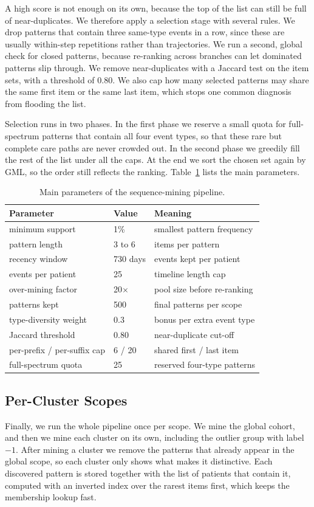 A high score is not enough on its own, because the top of the list can still be full of near-duplicates. We therefore apply a selection stage with several rules. We drop patterns that contain three same-type events in a row, since these are usually within-step repetitions rather than trajectories. We run a second, global check for closed patterns, because re-ranking across branches can let dominated patterns slip through. We remove near-duplicates with a Jaccard test on the item sets, with a threshold of $0.80$. We also cap how many selected patterns may share the same first item or the same last item, which stops one common diagnosis from flooding the list.

Selection runs in two phases. In the first phase we reserve a small quota for full-spectrum patterns that contain all four event types, so that these rare but complete care paths are never crowded out. In the second phase we greedily fill the rest of the list under all the caps. At the end we sort the chosen set again by GML, so the order still reflects the ranking. Table~\ref{tab:params} lists the main parameters.

\begin{table}[t]
\caption{Main parameters of the sequence-mining pipeline.}
\label{tab:params}
\centering
\small
\begin{tabular}{@{}lll@{}}
\toprule
Parameter & Value & Meaning \\
\midrule
minimum support & 1\% & smallest pattern frequency \\
pattern length & 3 to 6 & items per pattern \\
recency window & 730 days & events kept per patient \\
events per patient & 25 & timeline length cap \\
over-mining factor & 20$\times$ & pool size before re-ranking \\
patterns kept & 500 & final patterns per scope \\
type-diversity weight & 0.3 & bonus per extra event type \\
Jaccard threshold & 0.80 & near-duplicate cut-off \\
per-prefix / per-suffix cap & 6 / 20 & shared first / last item \\
full-spectrum quota & 25 & reserved four-type patterns \\
\bottomrule
\end{tabular}
\end{table}

\subsection{Per-Cluster Scopes}

Finally, we run the whole pipeline once per scope. We mine the global cohort, and then we mine each cluster on its own, including the outlier group with label $-1$. After mining a cluster we remove the patterns that already appear in the global scope, so each cluster only shows what makes it distinctive. Each discovered pattern is stored together with the list of patients that contain it, computed with an inverted index over the rarest items first, which keeps the membership lookup fast.
